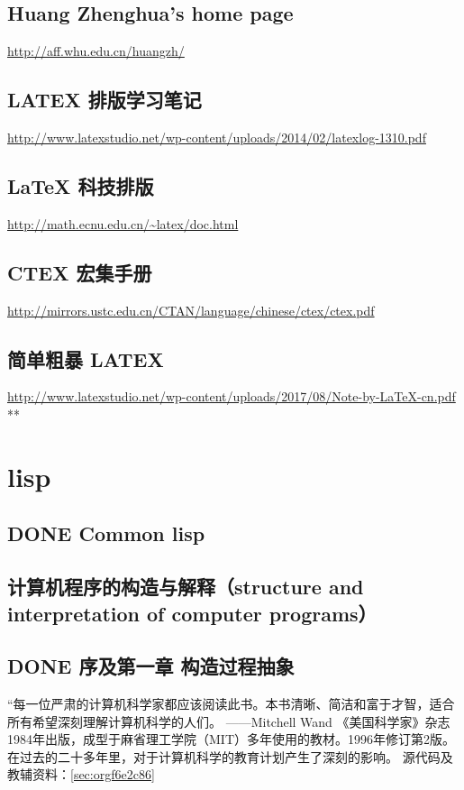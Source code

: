 \documentclass[11pt]{ctexart}
\begin{document}
\subsection{Huang Zhenghua's home page}
\label{sec:org96ec49a}
\url{http://aff.whu.edu.cn/huangzh/}
\subsection{LATEX 排版学习笔记}
\label{sec:org4a9151a}
\url{http://www.latexstudio.net/wp-content/uploads/2014/02/latexlog-1310.pdf}
\subsection{\LaTeX{} 科技排版}
\label{sec:org3567c52}
\url{http://math.ecnu.edu.cn/\~latex/doc.html}
\subsection{CTEX 宏集手册}
\label{sec:org406641b}
\url{http://mirrors.ustc.edu.cn/CTAN/language/chinese/ctex/ctex.pdf}
\subsection{简单粗暴 LATEX}
\label{sec:org72d413e}
\url{http://www.latexstudio.net/wp-content/uploads/2017/08/Note-by-LaTeX-cn.pdf}
**
\section{lisp}
\label{sec:org92d7a9b}
\subsection{{\bfseries\sffamily DONE} Common lisp}
\label{sec:org3e03901}
\subsection{计算机程序的构造与解释（structure and interpretation of computer programs）}
\label{sec:org7a7b30d}
\subsection{{\bfseries\sffamily DONE} 序及第一章 构造过程抽象}
\label{sec:org1ef5f35}
  “每一位严肃的计算机科学家都应该阅读此书。本书清晰、简洁和富于才智，适合所有希望深刻理解计算机科学的人们。
            ------Mitchell Wand
             《美国科学家》杂志
1984年出版，成型于麻省理工学院（MIT）多年使用的教材。1996年修订第2版。在过去的二十多年里，对于计算机科学的教育计划产生了深刻的影响。
源代码及教辅资料：\ref{sec:orgf6e2c86}
\end{document}
